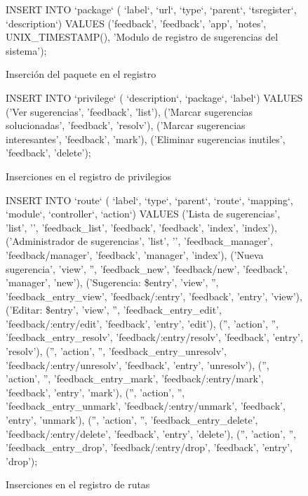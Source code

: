 \begin{figure}
\centering
\begin{SQL}
INSERT INTO `package` (
    `label`, `url`, `type`, `parent`,
    `tsregister`, `description`)
VALUES
    ('feedback', 'feedback', 'app', 'notes',
    UNIX_TIMESTAMP(),
   'Modulo de registro de sugerencias del sistema');
\end{SQL}
\caption{Inserción del paquete en el registro}
\label{code2}
\end{figure}

\begin{figure}
\centering
\begin{SQL}
INSERT INTO `privilege` (
    `description`, `package`, `label`)
VALUES
    ('Ver sugerencias',                 'feedback', 'list'),
    ('Marcar sugerencias solucionadas', 'feedback', 'resolv'),
    ('Marcar sugerencias interesantes', 'feedback', 'mark'),
    ('Eliminar sugerencias inutiles',   'feedback', 'delete');
\end{SQL}
\caption{Inserciones en el registro de privilegios}
\label{code3}
\end{figure}

\begin{figure}
\centering
\begin{SQL}
INSERT INTO `route` (
    `label`,
    `type`, `parent`, `route`,
    `mapping`,
    `module`, `controller`, `action`)
VALUES
    ('Lista de sugerencias',
     'list', '', 'feedback_list',
     'feedback',
     'feedback', 'index',   'index'),
    ('Administrador de sugerencias',
     'list', '', 'feedback_manager',
     'feedback/manager',
     'feedback', 'manager', 'index'),
    ('Nueva sugerencia',
     'view', '', 'feedback_new',
     'feedback/new',
     'feedback', 'manager', 'new'),
    ('Sugerencia: \$entry',
     'view', '', 'feedback_entry_view',
     'feedback/:entry',
     'feedback', 'entry', 'view'),
    ('Editar: \$entry',
     'view', '', 'feedback_entry_edit',
     'feedback/:entry/edit',
     'feedback', 'entry', 'edit'),
    ('', 'action', '', 'feedback_entry_resolv',
     'feedback/:entry/resolv',
     'feedback', 'entry', 'resolv'),
    ('', 'action', '', 'feedback_entry_unresolv',
     'feedback/:entry/unresolv',
     'feedback', 'entry', 'unresolv'),
    ('', 'action', '', 'feedback_entry_mark',
     'feedback/:entry/mark',
     'feedback', 'entry', 'mark'),
    ('', 'action', '', 'feedback_entry_unmark',
     'feedback/:entry/unmark',
     'feedback', 'entry', 'unmark'),
    ('', 'action', '', 'feedback_entry_delete',
     'feedback/:entry/delete',
     'feedback', 'entry', 'delete'),
    ('', 'action', '', 'feedback_entry_drop',
     'feedback/:entry/drop',
     'feedback', 'entry', 'drop');
\end{SQL}
\caption{Inserciones en el registro de rutas}
\label{code4}
\end{figure}

